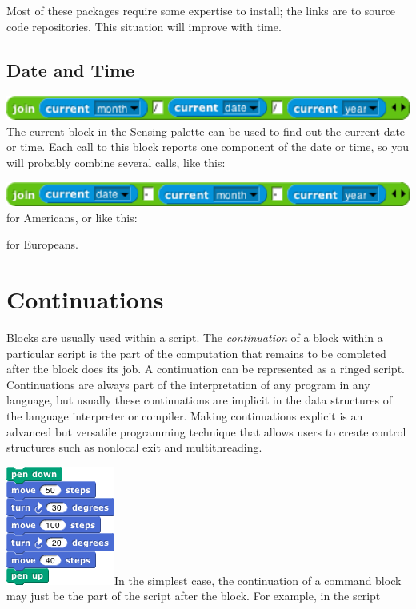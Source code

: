 Most of these packages require some expertise to install; the links are
to source code repositories. This situation will improve with time.

\subsection{Date and Time}\label{date-and-time}

\includegraphics[width=5.30556in,height=0.31944in]{media/image872.png}The
current block in the Sensing palette can be used to find out the current
date or time. Each call to this block reports one component of the date
or time, so you will probably combine several calls, like this:

\includegraphics[width=5.30556in,height=0.31944in]{media/image873.png}for
Americans, or like this:

for Europeans.

\section{\texorpdfstring{\hfill\break
Continuations}{ Continuations}}\label{continuations}

Blocks are usually used within a script. The \emph{continuation} of a
block within a particular script is the part of the computation that
remains to be completed after the block does its job. A continuation can
be represented as a ringed script. Continuations are always part of the
interpretation of any program in any language, but usually these
continuations are implicit in the data structures of the language
interpreter or compiler. Making continuations explicit is an advanced
but versatile programming technique that allows users to create control
structures such as nonlocal exit and multithreading.

\includegraphics[width=1.40625in,height=1.54167in]{media/image874.png}In
the simplest case, the continuation of a command block may just be the
part of the script after the block. For example, in the script

